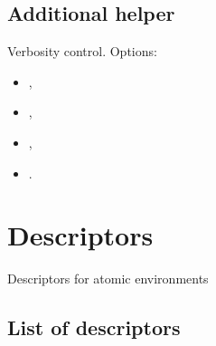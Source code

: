 \documentclass[letterpaper,10pt,english]{sphinxmanual}
\begin{document}
\subsection{Additional helper}
\label{\detokenize{gap:additional-helper}}

\begin{fulllineitems}
\label{\detokenize{gap:gap.Verbose}}
Verbosity control. Options:
\begin{itemize}
\item {} 
,

\item {} 
,

\item {} 
,

\item {} 
.

\end{itemize}

\end{fulllineitems}



\section{Descriptors}
\label{\detokenize{descriptors:descriptors}}\label{\detokenize{descriptors::doc}}
Descriptors for atomic environments


\subsection{List of descriptors}
\label{\detokenize{descriptors:module-gap.descriptors}}\label{\detokenize{descriptors:list-of-descriptors}}
\end{document}
